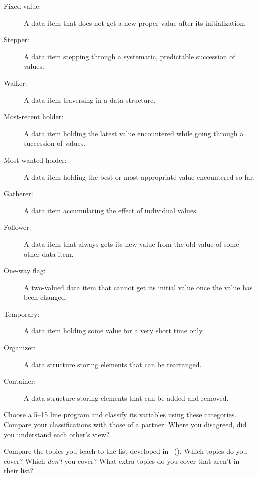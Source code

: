 \begin{description}

\item[Fixed value:]
  A data item that does not get a new proper value after its initialization.

\item[Stepper:]
  A data item stepping through a systematic, predictable succession of values.

\item[Walker:]
  A data item traversing in a data structure.

\item[Most-recent holder:]
  A data item holding the latest value encountered
  while going through a succession of values.

\item[Most-wanted holder:]
  A data item holding the best or most appropriate value encountered so far.

\item[Gatherer:]
  A data item accumulating the effect of individual values.

\item[Follower:]
  A data item that always gets its new value from the old value of some other data item.

\item[One-way flag:]
  A two-valued data item that cannot get its initial value once the value has been changed.

\item[Temporary:]
  A data item holding some value for a very short time only.

\item[Organizer:]
  A data structure storing elements that can be rearranged.

\item[Container:]
  A data structure storing elements that can be added and removed.

\end{description}

Choose a 5--15 line program and classify its variables using these categories.
Compare your classifications with those of a partner.
Where you disagreed,
did you understand each other's view?


Compare the topics you teach to the list developed in~\cite{Luxt2017} ().
Which topics do you cover?
Which \emph{don't} you cover?
What extra topics do you cover that aren't in their list?

